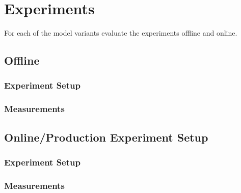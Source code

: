 \chapter{Experiments}
For each of the model variants evaluate the experiments offline and online.
\section{Offline}
\subsection{Experiment Setup}
\subsection{Measurements}

\section{Online/Production Experiment Setup}
\subsection{Experiment Setup}
\subsection{Measurements}